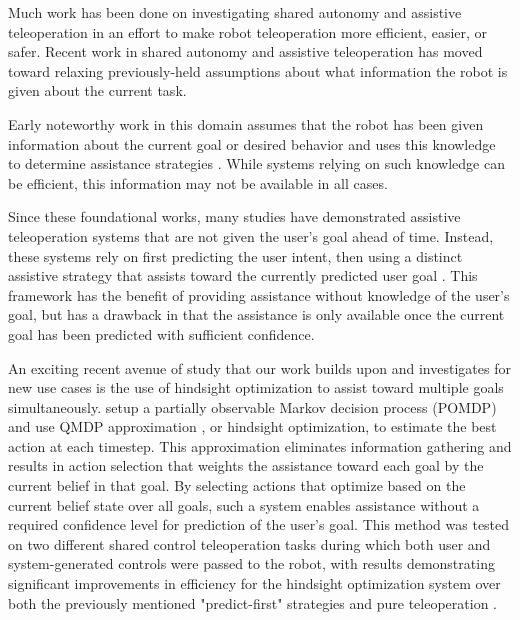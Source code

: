 \documentclass[conference]{IEEEtran}
\begin{document}
Much work has been done on investigating shared autonomy and assistive teleoperation in an effort to make robot teleoperation more efficient, easier, or safer. Recent work in shared autonomy and assistive teleoperation has moved toward relaxing previously-held assumptions about what information the robot is given about the current task. 

Early noteworthy work in this domain assumes that the robot has been given information about the current goal or desired behavior and uses this knowledge to determine assistance strategies \cite{aigner1997human, debus2001cooperative, goodrich2001experiments}. While systems relying on such knowledge can be efficient, this information may not be available in all cases.

Since these foundational works, many studies have demonstrated assistive teleoperation systems that are not given the user's goal ahead of time. Instead, these systems rely on first predicting the user intent, then using a distinct assistive strategy that assists toward the currently predicted user goal \cite{dragan2012formalizing, fagg2004extracting, kragic2005human, schultz2017goal, yu2005telemanipulation}. This framework has the benefit of providing assistance without knowledge of the user's goal, but has a drawback in that the assistance is only available once the current goal has been predicted with sufficient confidence. 

An exciting recent avenue of study that our work builds upon and investigates for new use cases is the use of hindsight optimization to assist toward multiple goals simultaneously. \citet{javdani2015shared} setup a partially observable Markov decision process (POMDP) and use QMDP approximation \cite{littman1995learning}, or hindsight optimization, to estimate the best action at each timestep. This approximation eliminates information gathering and results in action selection that weights the assistance toward each goal by the current belief in that goal. By selecting actions that optimize based on the current belief state over all goals, such a system enables assistance without a required confidence level for prediction of the user's goal. This method was tested on two different shared control teleoperation tasks during which both user and system-generated controls were passed to the robot, with results demonstrating significant improvements in efficiency for the hindsight optimization system over both the previously mentioned "predict-first" strategies and pure teleoperation \cite{javdani2018shared}.
\end{document}
